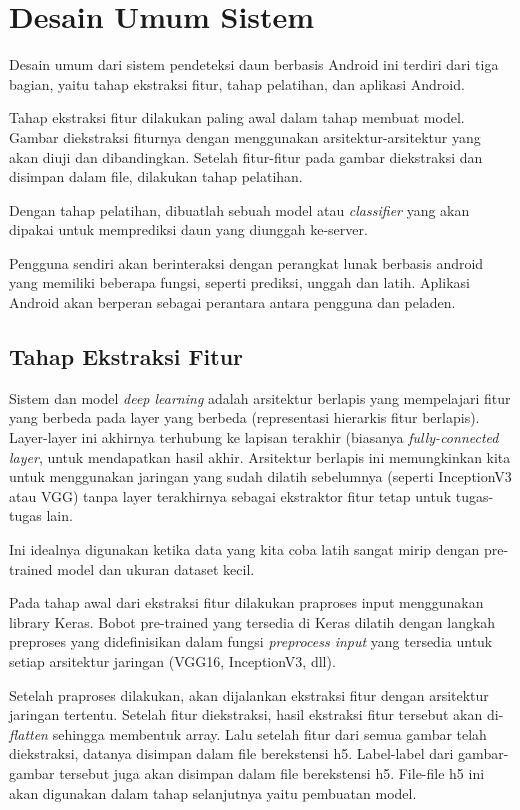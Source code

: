 \section{Desain Umum Sistem}
\par Desain umum dari sistem pendeteksi daun berbasis Android ini terdiri dari tiga bagian, yaitu tahap ekstraksi fitur, tahap pelatihan, dan aplikasi Android. 
\par Tahap ekstraksi fitur dilakukan paling awal dalam tahap membuat model. Gambar diekstraksi fiturnya dengan menggunakan arsitektur-arsitektur yang akan diuji dan dibandingkan. Setelah fitur-fitur pada gambar diekstraksi dan disimpan dalam file, dilakukan tahap pelatihan. 
\par Dengan tahap pelatihan, dibuatlah sebuah model atau \textit{classifier} yang akan dipakai untuk memprediksi daun yang diunggah ke-server.
\par Pengguna sendiri akan berinteraksi dengan perangkat lunak berbasis android yang memiliki beberapa fungsi, seperti prediksi, unggah dan latih. Aplikasi Android akan berperan sebagai perantara antara pengguna dan peladen.

\subsection{Tahap Ekstraksi Fitur}
\par Sistem dan model \textit{deep learning} adalah arsitektur berlapis yang mempelajari fitur yang berbeda pada layer yang berbeda (representasi hierarkis fitur berlapis). Layer-layer ini akhirnya terhubung ke lapisan terakhir (biasanya \textit{fully-connected layer}, untuk mendapatkan hasil akhir. Arsitektur berlapis ini memungkinkan kita untuk menggunakan jaringan yang sudah dilatih sebelumnya (seperti InceptionV3 atau VGG) tanpa layer terakhirnya sebagai ekstraktor fitur tetap untuk tugas-tugas lain.
\par Ini idealnya digunakan ketika data yang kita coba latih sangat mirip dengan pre-trained model dan ukuran dataset kecil.
\par Pada tahap awal dari ekstraksi fitur dilakukan praproses input menggunakan library Keras. Bobot pre-trained yang tersedia di Keras dilatih dengan langkah preproses yang didefinisikan dalam fungsi \textit{preprocess input} yang tersedia untuk setiap arsitektur jaringan (VGG16, InceptionV3, dll).
\par Setelah praproses dilakukan, akan dijalankan ekstraksi fitur dengan arsitektur jaringan tertentu. Setelah fitur diekstraksi, hasil ekstraksi fitur tersebut  akan di-\textit{flatten} sehingga membentuk array. Lalu setelah fitur dari semua gambar telah diekstraksi, datanya disimpan dalam file berekstensi h5. Label-label dari gambar-gambar tersebut juga akan disimpan dalam file berekstensi h5. File-file h5 ini akan digunakan dalam tahap selanjutnya yaitu pembuatan model.

